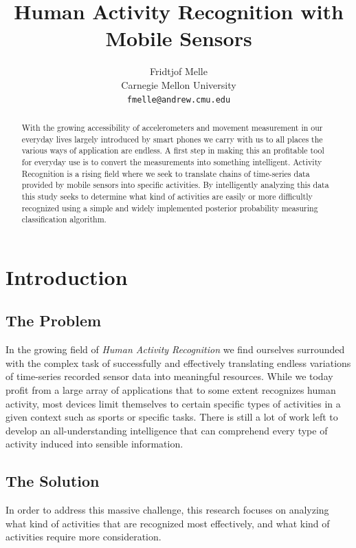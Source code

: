 \documentclass{sig-alternate}
\begin{document}
\title{Human Activity Recognition with Mobile Sensors}

\author{
Fridtjof Melle\\
Carnegie Mellon University\\
{\tt fmelle@andrew.cmu.edu}
}

\maketitle

\begin{abstract}
   With the growing accessibility of accelerometers and movement measurement in our everyday lives largely introduced by smart phones we carry with us to all places the various ways of application are endless. A first step in making this an profitable tool for everyday use is to convert the measurements into something intelligent. Activity Recognition is a rising field where we seek to translate chains of time-series data provided by mobile sensors into specific activities. By intelligently analyzing this data this study seeks to determine what kind of activities are easily or more difficultly recognized using a simple and widely implemented posterior probability measuring classification algorithm.
   
\end{abstract}

\section{Introduction}

\subsection{The Problem}
In the growing field of \textit{Human Activity Recognition} we find ourselves surrounded with the complex task of successfully and effectively translating endless variations of time-series recorded sensor data into meaningful resources. While we today profit from a large array of applications that to some extent recognizes human activity, most devices  limit themselves to certain specific types of activities in a given context such as sports or specific tasks. There is still a lot of work left to develop an all-understanding intelligence that can comprehend every type of activity induced into sensible information.

\subsection{The Solution}
In order to address this massive challenge, this research focuses on analyzing what kind of activities that are recognized most effectively, and what kind of activities require more consideration.
\end{document}
